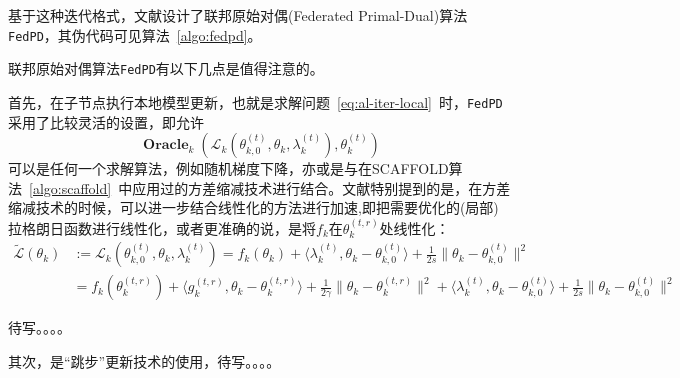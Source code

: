 基于这种迭代格式，文献\parencite{zhang2020fedpd}设计了联邦原始对偶(Federated Primal-Dual)算法\texttt{FedPD}，其伪代码可见算法~\ref{algo:fedpd}。



联邦原始对偶算法\texttt{FedPD}有以下几点是值得注意的。

首先，在子节点执行本地模型更新，也就是求解问题~\eqref{eq:al-iter-local}~时，\texttt{FedPD}采用了比较灵活的设置，即允许
\begin{equation*}
\operatorname{\mathbf{Oracle}}_k(\mathcal{L}_k(\theta_{k, 0}^{(t)}, \theta_k, \lambda_k^{(t)}), \theta_k^{(t)})
\end{equation*}
可以是任何一个求解算法，例如随机梯度下降，亦或是与在SCAFFOLD算法~\ref{algo:scaffold}~中应用过的方差缩减技术进行结合。文献\parencite{zhang2020fedpd}特别提到的是，在方差缩减技术的时候，可以进一步结合线性化的方法进行加速,即把需要优化的(局部)拉格朗日函数进行线性化，或者更准确的说，是将$f_k$在$\theta_{k}^{(t,r)}$处线性化：
\begin{equation*}
\begin{aligned}
\widetilde{\mathcal{L}}(\theta_{k}) & := \mathcal{L}_k(\theta_{k, 0}^{(t)}, \theta_k, \lambda_k^{(t)}) = f_k(\theta_k) + \langle \lambda_k^{(t)}, \theta_k - \theta_{k, 0}^{(t)} \rangle + \frac{1}{2s} \lVert \theta_k - \theta_{k, 0}^{(t)} \rVert^2 \\
& = f_k(\theta_k^{(t,r)}) + \langle g_k^{(t,r)}, \theta_k - \theta_k^{(t,r)} \rangle + \frac{1}{2\gamma} \lVert \theta_k - \theta_k^{(t,r)} \rVert^2 + \langle \lambda_k^{(t)}, \theta_k - \theta_{k, 0}^{(t)} \rangle + \frac{1}{2s} \lVert \theta_k - \theta_{k, 0}^{(t)} \rVert^2
\end{aligned}
\end{equation*}

待写。。。。

其次，是``跳步''更新技术的使用，待写。。。。
